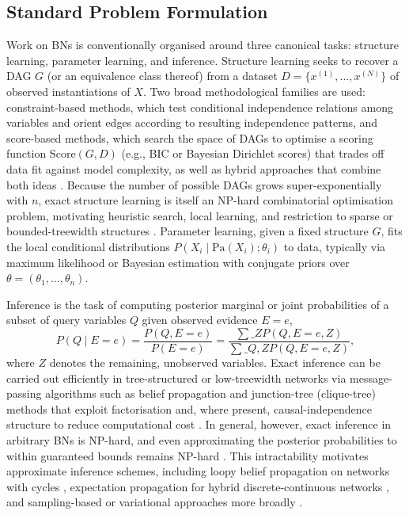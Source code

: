 \subsection{Standard Problem Formulation}
Work on BNs is conventionally organised around three canonical tasks: structure learning, parameter learning, and inference. Structure learning seeks to recover a DAG $G$ (or an equivalence class thereof) from a dataset $D = \{x^{(1)}, \dots, x^{(N)}\}$ of observed instantiations of $X$. Two broad methodological families are used: constraint-based methods, which test conditional independence relations among variables and orient edges according to resulting independence patterns, and score-based methods, which search the space of DAGs to optimise a scoring function $\mathrm{Score}(G, D)$ (e.g., BIC or Bayesian Dirichlet scores) that trades off data fit against model complexity, as well as hybrid approaches that combine both ideas \cite{kitson2023survey,tsamardinos2006max}. Because the number of possible DAGs grows super-exponentially with $n$, exact structure learning is itself an NP-hard combinatorial optimisation problem, motivating heuristic search, local learning, and restriction to sparse or bounded-treewidth structures \cite{tsamardinos2006max,kitson2023survey}. Parameter learning, given a fixed structure $G$, fits the local conditional distributions $P(X_i \mid \mathrm{Pa}(X_i); \theta_i)$ to data, typically via maximum likelihood or Bayesian estimation with conjugate priors over $\theta = (\theta_1, \dots, \theta_n)$.

Inference is the task of computing posterior marginal or joint probabilities of a subset of query variables $Q$ given observed evidence $E = e$,
\begin{equation}
P(Q \mid E = e) = \frac{P(Q, E = e)}{P(E = e)} = \frac{\sum\_{Z} P(Q, E = e, Z)}{\sum\_{Q,Z} P(Q, E = e, Z)},
\end{equation}
where $Z$ denotes the remaining, unobserved variables. Exact inference can be carried out efficiently in tree-structured or low-treewidth networks via message-passing algorithms such as belief propagation and junction-tree (clique-tree) methods that exploit factorisation and, where present, causal-independence structure to reduce computational cost \cite{zhang1996exploiting}. In general, however, exact inference in arbitrary BNs is NP-hard, and even approximating the posterior probabilities to within guaranteed bounds remains NP-hard \cite{dagum1993approximating}. This intractability motivates approximate inference schemes, including loopy belief propagation on networks with cycles \cite{murphy2013loopy}, expectation propagation for hybrid discrete-continuous networks \cite{minka2013expectation}, and sampling-based or variational approaches more broadly \cite{salmeron2018review}.


